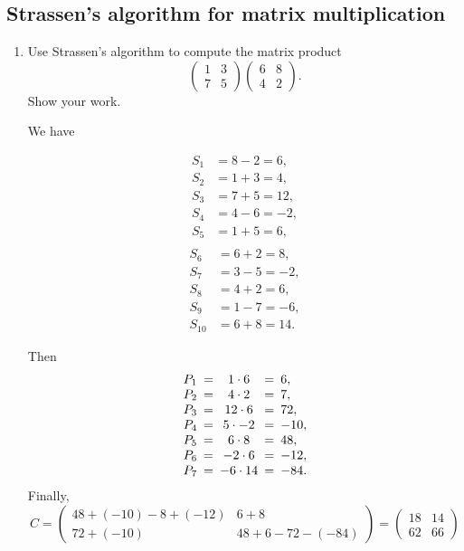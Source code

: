 \documentclass[Chapter04]{subfiles}
\begin{document}
	\subsection{Strassen's algorithm for matrix multiplication}

	\begin{enumerate}
		\item Use Strassen's algorithm to compute the matrix product
		\[
			\begin{pmatrix}
				1 & 3\\
				7 & 5
			\end{pmatrix}
			\begin{pmatrix}
				6 & 8\\
				4 & 2
			\end{pmatrix}.
		\]
		Show your work.
		\begin{answer}
			We have
			\begin{multicols}{2}
				\noindent
				\begin{align*}
					S_1 &= 8 - 2 = 6,\\
					S_2 &= 1 + 3 = 4,\\
					S_3 &= 7 + 5 = 12,\\
					S_4 &= 4 - 6 = -2,\\
					S_5 &= 1 + 5 = 6,\\
				\end{align*}
				\begin{align*}
					S_6 &= 6 + 2 = 8,\\
					S_7 &= 3 - 5 = -2,\\
					S_8 &= 4 + 2 = 6,\\
					S_9 &= 1 - 7 = -6,\\
					S_{10} &= 6 + 8 = 14.
				\end{align*}
			\end{multicols}
			Then
			\[
				\begin{array}{r!{=}c!{=}l}
					P_1 & 1 \cdot 6  & 6,\\
					P_2 & 4 \cdot 2  & 7,\\
					P_3 & 12 \cdot 6 & 72,\\
					P_4 & 5 \cdot -2 & -10,\\
					P_5 & 6 \cdot 8  & 48,\\
					P_6 & -2 \cdot 6 & -12,\\
					P_7 & -6 \cdot 14 & -84.
				\end{array}
			\]
			Finally,
			\[
				C =
				\begin{pmatrix}
					48 + (-10) - 8 + (-12) & 6 + 8\\
					72 + (-10) & 48 + 6 - 72 - (-84)
				\end{pmatrix}
				=
				\begin{pmatrix}
					18 & 14\\
					62 & 66
				\end{pmatrix}
			\]
		\end{answer}


\end{enumerate}
\end{document}
